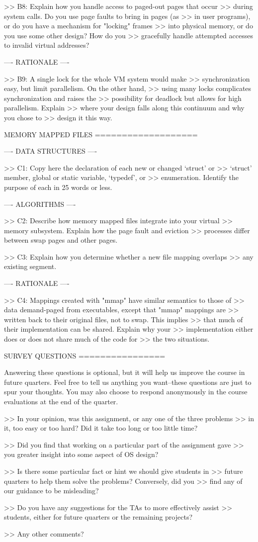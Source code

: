 >> B8: Explain how you handle access to paged-out pages that occur
>> during system calls.  Do you use page faults to bring in pages (as
>> in user programs), or do you have a mechanism for "locking" frames
>> into physical memory, or do you use some other design?  How do you
>> gracefully handle attempted accesses to invalid virtual addresses?

---- RATIONALE ----

>> B9: A single lock for the whole VM system would make
>> synchronization easy, but limit parallelism.  On the other hand,
>> using many locks complicates synchronization and raises the
>> possibility for deadlock but allows for high parallelism.  Explain
>> where your design falls along this continuum and why you chose to
>> design it this way.

             MEMORY MAPPED FILES
             ===================

---- DATA STRUCTURES ----

>> C1: Copy here the declaration of each new or changed `struct' or
>> `struct' member, global or static variable, `typedef', or
>> enumeration.  Identify the purpose of each in 25 words or less.

---- ALGORITHMS ----

>> C2: Describe how memory mapped files integrate into your virtual
>> memory subsystem.  Explain how the page fault and eviction
>> processes differ between swap pages and other pages.

>> C3: Explain how you determine whether a new file mapping overlaps
>> any existing segment.

---- RATIONALE ----

>> C4: Mappings created with "mmap" have similar semantics to those of
>> data demand-paged from executables, except that "mmap" mappings are
>> written back to their original files, not to swap.  This implies
>> that much of their implementation can be shared.  Explain why your
>> implementation either does or does not share much of the code for
>> the two situations.

               SURVEY QUESTIONS
               ================

Answering these questions is optional, but it will help us improve the
course in future quarters.  Feel free to tell us anything you
want--these questions are just to spur your thoughts.  You may also
choose to respond anonymously in the course evaluations at the end of
the quarter.

>> In your opinion, was this assignment, or any one of the three problems
>> in it, too easy or too hard?  Did it take too long or too little time?

>> Did you find that working on a particular part of the assignment gave
>> you greater insight into some aspect of OS design?

>> Is there some particular fact or hint we should give students in
>> future quarters to help them solve the problems?  Conversely, did you
>> find any of our guidance to be misleading?

>> Do you have any suggestions for the TAs to more effectively assist
>> students, either for future quarters or the remaining projects?

>> Any other comments?
